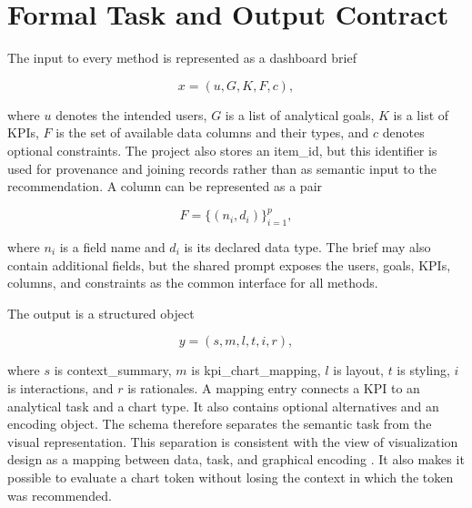 \section{Formal Task and Output Contract}

The input to every method is represented as a dashboard brief

\[
x = (u, G, K, F, c),
\]

where \(u\) denotes the intended users, \(G\) is a list of analytical goals, \(K\) is a list of KPIs, \(F\) is the set of available data columns and their types, and \(c\) denotes optional constraints. The project also stores an item\_id, but this identifier is used for provenance and joining records rather than as semantic input to the recommendation. A column can be represented as a pair

\[
F = \{(n_i, d_i)\}_{i=1}^{p},
\]

where \(n_i\) is a field name and \(d_i\) is its declared data type. The brief may also contain additional fields, but the shared prompt exposes the users, goals, KPIs, columns, and constraints as the common interface for all methods.

The output is a structured object

\[
y = (s, m, l, t, i, r),
\]

where \(s\) is context\_summary, \(m\) is kpi\_chart\_mapping, \(l\) is layout, \(t\) is styling, \(i\) is interactions, and \(r\) is rationales. A mapping entry connects a KPI to an analytical task and a chart type. It also contains optional alternatives and an encoding object. The schema therefore separates the semantic task from the visual representation. This separation is consistent with the view of visualization design as a mapping between data, task, and graphical encoding \cite{mackinlay1986apt,munzner2014visualization}. It also makes it possible to evaluate a chart token without losing the context in which the token was recommended.

